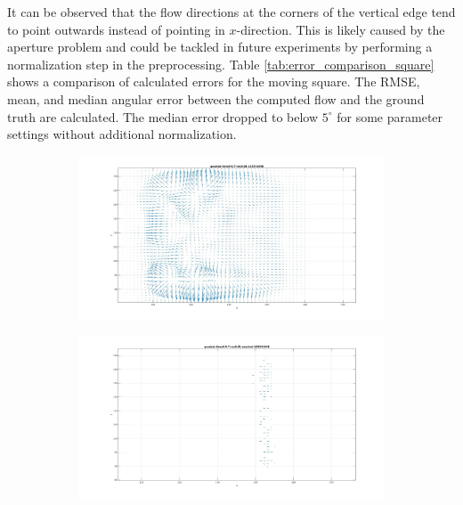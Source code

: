 It can be observed that the flow directions at the corners of the vertical edge tend to point outwards instead of pointing in $x$-direction. 
This is likely caused by the aperture problem and could be tackled in future experiments by performing a normalization step in the preprocessing.
Table \ref{tab:error_comparison_square} shows a comparison of calculated errors for the moving square. The RMSE, mean, and median angular error between the computed flow and the ground truth are calculated. 
The median error dropped to below $5^\circ$ for some parameter settings without additional normalization. 


\begin{figure}[tb]
\centering
\begin{subfigure}{.45\textwidth}
  \centering
  \includegraphics[height=.6\linewidth]{figs/quadrat_close.jpg}
  \caption{}
  \label{fig:qaudrat-close-masking-1}
\end{subfigure}
\begin{subfigure}{.45\textwidth}
  \centering
  \includegraphics[height=.6\linewidth]{figs/quadrat_close_mask.jpg}

\end{subfigure}
\end{figure}
